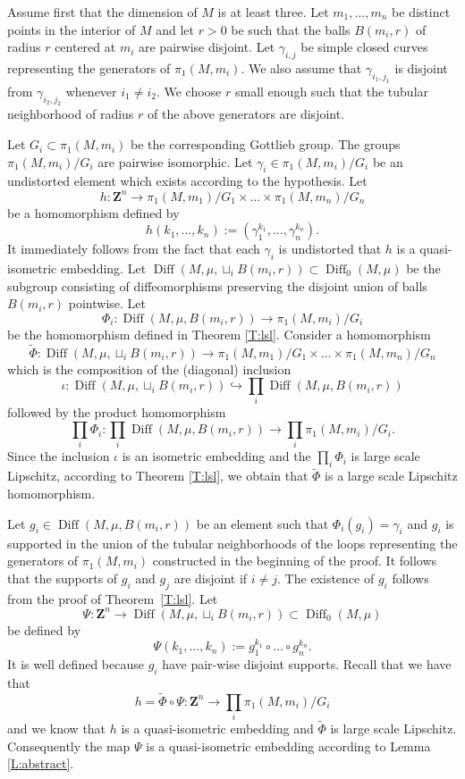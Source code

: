 \documentclass[a4paper,12pt]{amsart}
\def\Diff{\operatorname{Diff}}
\def\g{\gamma}
\theoremstyle{definition}
\def\B{\mathbf}
\begin{document}
Assume first that the dimension of $M$ is at least three.
Let $m_1,\ldots,m_n$ be distinct points in the interior of $M$ and
let $r>0$ be such that the balls $B(m_i,r)$
of radius $r$ centered at $m_i$ are pairwise disjoint.
Let $\g_{i,j}$ be simple closed curves representing
the generators of $\pi_1(M,m_i)$. We also assume
that $\g_{i_1,j_1}$ is disjoint from $\g_{i_2,j_2}$
whenever $i_1\neq i_2$. We choose $r$ small enough
such that the tubular neighborhood of radius $r$
of the above generators are disjoint.

Let $G_i\subset \pi_1(M,m_i)$ be the corresponding Gottlieb
group. The groups $\pi_1(M,m_i)/G_i$ are pairwise isomorphic.
Let $\g_i \in \pi_1(M,m_i)/G_i$ be an undistorted element
which exists according to the hypothesis. Let
$$
h\colon \B Z^n\to \pi_1(M,m_1)/G_1\times \ldots \times \pi_1(M,m_n)/G_n
$$
be a homomorphism defined by
$$
h(k_1,\ldots,k_n):= (\g_1^{k_1},\ldots,\g_n^{k_n}).
$$
It immediately follows from the fact that each $\g_i$ is undistorted
that $h$ is a quasi-isometric embedding.
Let $\Diff(M,\mu,\sqcup_i B(m_i,r))\subset \Diff_0(M,\mu)$ be the subgroup consisting
of diffeomorphisms preserving the disjoint union of balls
$B(m_i,r)$ pointwise. Let
$$
\Phi_i\colon \Diff(M,\mu,B(m_i,r))\to \pi_1(M,m_i)/G_i
$$
be the homomorphism defined in Theorem \ref{T:lsl}.
Consider a homomorphism
$$
\widetilde \Phi\colon \Diff(M,\mu,\sqcup_i B(m_i,r))\to
\pi_1(M,m_1)/G_1\times \ldots \times \pi_1(M,m_n)/G_n
$$
which is the composition of the (diagonal) inclusion
$$
\iota\colon \Diff(M,\mu,\sqcup_i B(m_i,r))\hookrightarrow
\prod_i \Diff(M,\mu,B(m_i,r))
$$
followed by the product homomorphism
$$
\prod_i \Phi_i\colon \prod_i \Diff(M,\mu,B(m_i,r))\to \prod_i \pi_1(M,m_i)/G_i.
$$
Since the inclusion $\iota$ is an isometric embedding and the
$\prod_i\Phi_i$ is large scale Lipschitz, according to Theorem \ref{T:lsl},
we obtain that $\widetilde \Phi$ is a large scale Lipschitz homomorphism.

Let $g_i\in \Diff(M,\mu,B(m_i,r))$ be an element such that
$\Phi_i(g_i)=\g_i$ and $g_i$ is supported in the
union of the tubular neighborhoods of the loops
representing the generators of $\pi_1(M,m_i)$ constructed
in the beginning of the proof. It follows that
the supports of $g_i$ and $g_j$ are disjoint
if $i\neq j$. The existence of $g_i$ follows from the
proof of Theorem~\ref{T:lsl}.
Let
$$
\Psi\colon \B Z^n\to \Diff(M,\mu,\sqcup_iB(m_i,r))\subset \Diff_0(M,\mu)
$$
be defined by
$$
\Psi(k_1,\ldots,k_n):= g_1^{k_1}\circ \dots \circ g_n^{k_n}.
$$
It is well defined because $g_i$ have pair-wise disjoint supports.
Recall that we have that
$$
h=\widetilde \Phi\circ \Psi\colon \B Z^n \to \prod_i\pi_1(M,m_i)/G_i
$$
and we know that $h$ is a quasi-isometric embedding and
$\widetilde \Phi$ is large scale Lipschitz.
Consequently the map $\Psi$ is a quasi-isometric
embedding according to Lemma \ref{L:abstract}.
\end{document}
